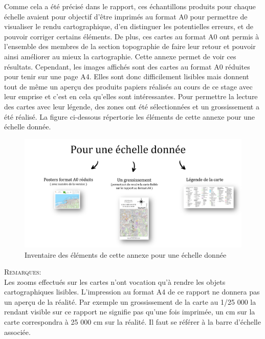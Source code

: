 \documentclass{themeensg}
\begin{document}
\begin{appendices}
Comme cela a été précisé dans le rapport, ces échantillons produits pour chaque échelle avaient pour objectif d'être imprimés au format A0 pour permettre de visualiser le rendu cartographique, d'en distinguer les potentielles erreurs, et de pouvoir corriger certains éléments. De plus, ces cartes au format A0 ont permis à l'ensemble des membres de la section topographie de faire leur retour et pouvoir ainsi améliorer au mieux la cartographie. Cette annexe permet de voir ces résultats. Cependant, les images affichés sont des cartes au format A0 réduites pour tenir sur une page A4. Elles sont donc difficilement lisibles mais donnent tout de même un aperçu des produits papiers réalisés au cours de ce stage avec leur emprise et c'est en cela qu'elles sont intéressantes. Pour permettre la lecture des cartes avec leur légende, des zones ont été sélectionnées et un grossissement a été réalisé. La figure ci-dessous répertorie les éléments de cette annexe pour une échelle donnée.\\

\begin{figure}[!h]
\centering
\includegraphics[width=\linewidth]{images/Annexes/Resultat/resultat_explication.png}%
\caption{Inventaire des éléments de cette annexe pour une échelle donnée}

\label{inventaire}%
\end{figure}

\textsc{Remarques}:\\
Les zooms effectués sur les cartes n'ont vocation qu'à rendre les objets cartographiques lisibles. L'impression au format A4 de ce rapport ne donnera pas un aperçu de la réalité. Par exemple un grossissement de la carte au 1/25 000 la rendant visible sur ce rapport ne signifie pas qu'une fois imprimée, un cm sur la carte correspondra à 25 000 cm sur la réalité. Il faut se référer à la barre d'échelle associée.



\end{appendices}
\end{document}
